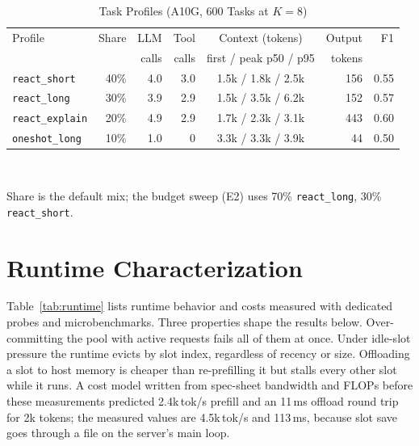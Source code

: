 \documentclass[conference]{IEEEtran}
\begin{document}
\begin{table}[t]
  \caption{Task Profiles (A10G, 600 Tasks at $K=8$)}
  \label{tab:workload}
  \centering
  \footnotesize
  \setlength{\tabcolsep}{2.5pt}
  \begin{tabular}{@{}lrrrcrr@{}}
    \toprule
    Profile & Share & LLM & Tool & Context (tokens) & Output & F1 \\
     & & calls & calls & first / peak p50 / p95 & tokens & \\
    \midrule
    \texttt{react\_short} & 40\% & 4.0 & 3.0 & 1.5k / 1.8k / 2.5k & 156 & 0.55 \\
    \texttt{react\_long} & 30\% & 3.9 & 2.9 & 1.5k / 3.5k / 6.2k & 152 & 0.57 \\
    \texttt{react\_explain} & 20\% & 4.9 & 2.9 & 1.7k / 2.3k / 3.1k & 443 & 0.60 \\
    \texttt{oneshot\_long} & 10\% & 1.0 & 0 & 3.3k / 3.3k / 3.9k & 44 & 0.50 \\
    \bottomrule
  \end{tabular}\\[2pt]
  \raggedright\scriptsize Share is the default mix; the budget sweep (E2) uses 70\% \texttt{react\_long},
  30\% \texttt{react\_short}.
\end{table}

\section{Runtime Characterization}

Table~\ref{tab:runtime} lists runtime behavior and costs measured with dedicated probes and
microbenchmarks. Three properties shape the results below. Over-committing the pool with active requests
fails all of them at once. Under idle-slot pressure the runtime evicts by slot index, regardless of
recency or size. Offloading a slot to host memory is cheaper than re-prefilling it but stalls every
other slot while it runs. A cost model written from spec-sheet bandwidth and FLOPs before these
measurements predicted 2.4k\,tok/s prefill and an 11\,ms offload round trip for 2k tokens; the measured
values are 4.5k\,tok/s and 113\,ms, because slot save goes through a file on the server's main loop.
\end{document}
